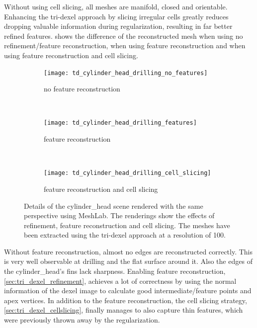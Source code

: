 Without using cell slicing, all meshes are manifold, closed and orientable.
Enhancing the tri-dexel approach by slicing irregular cells greatly reduces dropping valuable information during regularization, resulting in far better refined features.
 shows the difference of the reconstructed mesh when using no refinement/feature reconstruction, when using feature reconstruction and when using feature reconstruction and cell slicing.
%
\begin{figure}
	\centering
	\begin{subfigure}[b]{0.67\textwidth}
		\centering
		\texttt{[image: td\_cylinder\_head\_drilling\_no\_features]}
		\caption{no feature reconstruction}
		\label{fig:td_cylinder_head_drilling_no_features}
	\end{subfigure}
	\bigskip\\
	\begin{subfigure}[b]{0.67\textwidth}
		\centering
		\texttt{[image: td\_cylinder\_head\_drilling\_features]}
		\caption{feature reconstruction}
		\label{fig:td_cylinder_head_drilling_features}
	\end{subfigure}
	\bigskip\\
	\begin{subfigure}[b]{0.67\textwidth}
		\centering
		\texttt{[image: td\_cylinder\_head\_drilling\_cell\_slicing]}
		\caption{feature reconstruction and cell slicing}
		\label{fig:td_cylinder_head_drilling_cell_slicing}
	\end{subfigure}
	\caption{
		Details of the cylinder\_head scene rendered with the same perspective using MeshLab.
		The renderings show the effects of refinement, feature reconstruction and cell slicing.
		The meshes have been extracted using the tri-dexel approach at a resolution of 100.
	}
	\label{fig:td_features_and_cell_slicing}
\end{figure}
%
Without feature reconstruction, almost no edges are reconstructed correctly.
This is very well observable at drilling and the flat surface around it.
Also the edges of the cylinder\_head's fins lack sharpness.
Enabling feature reconstruction, \cf \cref{sec:tri_dexel_refinement}, achieves a lot of correctness by using the normal information of the dexel image to calculate good intermediate/feature points and apex vertices.
In addition to the feature reconstruction, the cell slicing strategy, \cf \cref{sec:tri_dexel_cellslicing}, finally manages to also capture thin features, which were previously thrown away by the regularization.

